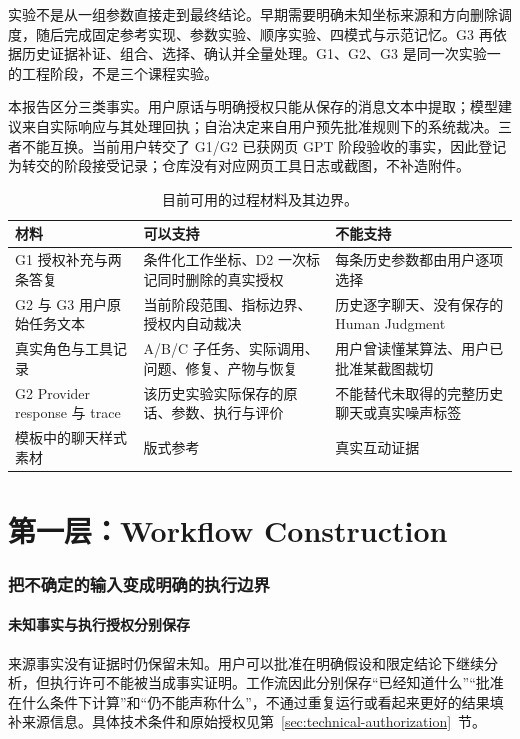 \documentclass[11pt,a4paper]{article}
\begin{document}
实验不是从一组参数直接走到最终结论。早期需要明确未知坐标来源和方向删除调度，随后完成固定参考实现、参数实验、顺序实验、四模式与示范记忆。G3 再依据历史证据补证、组合、选择、确认并全量处理。G1、G2、G3 是同一次实验一的工程阶段，不是三个课程实验。

本报告区分三类事实。用户原话与明确授权只能从保存的消息文本中提取；模型建议来自实际响应与其处理回执；自治决定来自用户预先批准规则下的系统裁决。三者不能互换。当前用户转交了 G1/G2 已获网页 GPT 阶段验收的事实，因此登记为转交的阶段接受记录；仓库没有对应网页工具日志或截图，不补造附件。

\begin{table}[H]\centering\small\caption{目前可用的过程材料及其边界。}\begin{tabularx}{\linewidth}{@{}p{30mm}Y Y@{}}\toprule 材料 & 可以支持 & 不能支持 \\ \midrule
G1 授权补充与两条答复 & 条件化工作坐标、D2 一次标记同时删除的真实授权 & 每条历史参数都由用户逐项选择 \\
G2 与 G3 用户原始任务文本 & 当前阶段范围、指标边界、授权内自动裁决 & 历史逐字聊天、没有保存的 Human Judgment \\
真实角色与工具记录 & A/B/C 子任务、实际调用、问题、修复、产物与恢复 & 用户曾读懂某算法、用户已批准某截图裁切 \\
G2 Provider response 与 trace & 该历史实验实际保存的原话、参数、执行与评价 & 不能替代未取得的完整历史聊天或真实噪声标签 \\
模板中的聊天样式素材 & 版式参考 & 真实互动证据 \\
\bottomrule\end{tabularx}\end{table}

\part*{第一层：Workflow Construction}

\section{把不确定的输入变成明确的执行边界}
\subsection{未知事实与执行授权分别保存}
来源事实没有证据时仍保留未知。用户可以批准在明确假设和限定结论下继续分析，但执行许可不能被当成事实证明。工作流因此分别保存“已经知道什么”“批准在什么条件下计算”和“仍不能声称什么”，不通过重复运行或看起来更好的结果填补来源信息。具体技术条件和原始授权见第~\ref{sec:technical-authorization}~节。
\end{document}
